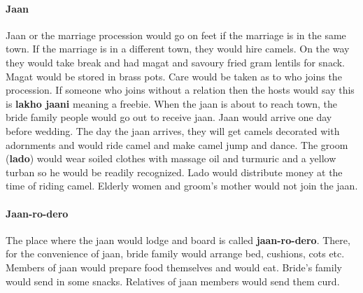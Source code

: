 \paragraph{Jaan} Jaan or the marriage procession would go on feet if the
marriage is in the same town. If the marriage is in a different town, they
would hire camels. On the way they would take break and had magat and savoury
fried gram lentils for snack. Magat would be stored in brass pots. Care would
be taken as to who joins the procession. If someone who joins without a
relation then the hosts would say this is \textbf{lakho jaani} meaning a
freebie. When the jaan is about to reach town, the bride family people would go
out to receive jaan. Jaan would arrive one day before wedding. The day the jaan
arrives, they will get camels decorated with adornments and would ride camel
and make camel jump and dance. The groom (\textbf{lado}) would wear soiled
clothes with massage oil and turmuric and a yellow turban so he would be
readily recognized. Lado would distribute money at the time of riding camel.
Elderly women and groom's mother would not join the jaan.

\paragraph{Jaan-ro-dero} The place where the jaan would lodge and board is
called \textbf{jaan-ro-dero}. There, for the convenience of jaan, bride family
would arrange bed, cushions, cots etc. Members of jaan would prepare food
themselves and would eat. Bride's family would send in some snacks. Relatives
of jaan members would send them curd.

